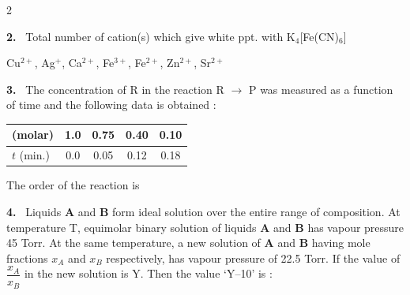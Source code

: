 \documentclass[10pt]{extarticle}
\newcommand{\qn}[1]{\par\smallskip\noindent\textbf{#1.}~}
\begin{document}
\begin{multicols}{2}
\qn{2} Total number of cation(s) which give white ppt. with K$_4$[Fe(CN)$_6$]
\par\noindent Cu$^{2+}$, Ag$^+$, Ca$^{2+}$, Fe$^{3+}$, Fe$^{2+}$, Zn$^{2+}$, Sr$^{2+}$
\qn{3} The concentration of R in the reaction R $\to$ P was measured as a function of time and the following data is obtained :
\begin{center}\footnotesize\setlength{\tabcolsep}{3pt}
\begin{tabular}{|l|c|c|c|c|}\hline
[R] (molar)&1.0&0.75&0.40&0.10\\\hline
$t$ (min.)&0.0&0.05&0.12&0.18\\\hline
\end{tabular}\end{center}
The order of the reaction is
\qn{4} Liquids \textbf{A} and \textbf{B} form ideal solution over the entire range of composition. At temperature T, equimolar binary solution of liquids \textbf{A} and \textbf{B} has vapour pressure 45 Torr. At the same temperature, a new solution of \textbf{A} and \textbf{B} having mole fractions $x_A$ and $x_B$ respectively, has vapour pressure of 22.5 Torr. If the value of $\dfrac{x_A}{x_B}$ in the new solution is Y. Then the value `Y--10' is :


\end{multicols}
\end{document}
